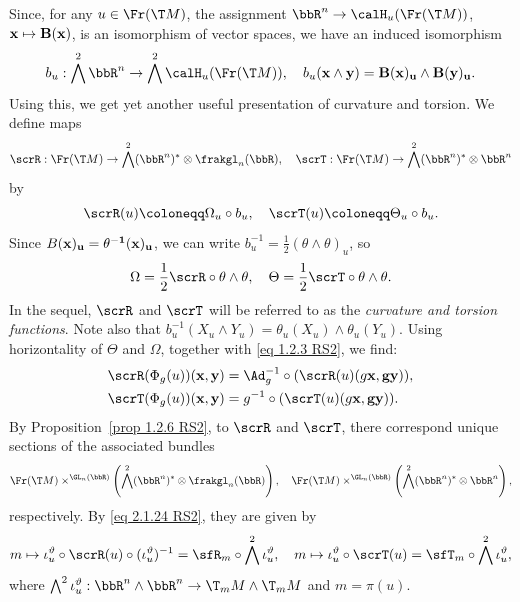 \begin{rem}\label{rem 2.1.16 RS2}
    Since, for any $u\in\Fr(\T M)$, the assignment $\bbR^n\to \calH_u (\Fr(\T M))$, $\bf{x}\mapsto B(\bf{x})$, is an isomorphism of vector spaces, we have an induced isomorphism 
    \[b_u:\bigwedge^2\bbR^n\to \bigwedge^2 \calH_u(\Fr(\T M)),\quad b_u(\bf{x}\wedge\bf{y})=B(\bf{x})_u\wedge B(\bf{y})_u.\]
    Using this, we get yet another useful presentation of curvature and torsion. We define maps 
    \[\scrR:\Fr(\T M)\to \bigwedge^2(\bbR^n)^\ast \otimes\frakgl_n(\bbR),\quad \scrT:\Fr(\T M)\to \bigwedge^2(\bbR^n)^\ast\otimes\bbR^n\]
    by 
    \[\scrR(u)\coloneqq \Omega_u\circ b_u,\quad \scrT(u)\coloneqq \Theta_u\circ b_u.\label{eq 2.1.24 RS2}\]
    Since $B(\bf{x})_u=\theta^{-1}(\bf{x})_u$, we can write $b_u^{-1}=\frac12(\theta\wedge\theta)_u$, so 
    \[\Omega=\frac12\scrR\circ \theta\wedge\theta,\quad \Theta=\frac12\scrT\circ\theta\wedge\theta.\label{eq def affine curvature, torsion functions}\]
    In the sequel, $\scrR$ and $\scrT$ will be referred to as the \emph{curvature and torsion functions}. Note also that $b_u^{-1}(X_u\wedge Y_u)=\theta_u(X_u)\wedge\theta_u(Y_u)$. Using horizontality of $\Theta$ and $\Omega$, together with \eqref{eq 1.2.3 RS2}, we find:
    \begin{align}
        \scrR(\Phi_g(u))(\bf{x},\bf{y})&=\Ad_g^{-1}\circ (\scrR(u)(g\bf{x},g\bf{y})),\\
        \scrT(\Phi_g(u))(\bf{x},\bf{y})&= g^{-1}\circ (\scrT(u)(g\bf{x},g\bf{y})).
    \end{align}
    By Proposition~\ref{prop 1.2.6 RS2}, to $\scrR$ and $\scrT$, there correspond unique sections of the associated bundles 
    \[\Fr(\T M)\times^{\GL_n(\bbR)}\left(\bigwedge^2(\bbR^n)^\ast \otimes \frakgl_n(\bbR)\right),\quad \Fr(\T M)\times^{\GL_n(\bbR)}\left(\bigwedge^2(\bbR^n)^\ast \otimes\bbR^n\right),\]
    respectively. By \eqref{eq 2.1.24 RS2}, they are given by 
    \[m\mapsto \iota_u^\vartheta\circ \scrR(u)\circ (\iota_u^\vartheta)^{-1}=\sfR_m\circ\bigwedge^2 \iota_u^\vartheta,\quad m\mapsto \iota_u^\vartheta\circ\scrT(u)=\sfT_m\circ \bigwedge^2 \iota_u^\vartheta,\]
    where $\bigwedge^2 \iota_u^\vartheta:\bbR^n\wedge\bbR^n\to \T_mM\wedge \T_mM$ and $m=\pi(u)$.
\end{rem}



